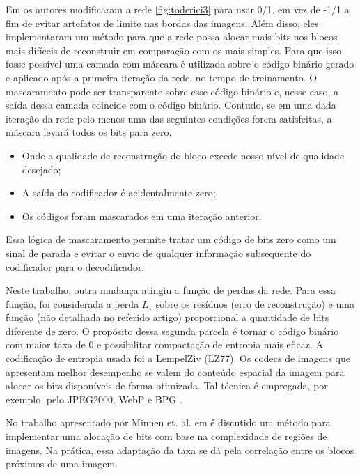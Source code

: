 Em \cite{target} os autores modificaram a rede \ref{fig:toderici3} 
para usar 0/1, em vez de -1/1 a fim de evitar artefatos de limite nas bordas das imagens. Além disso, eles implementaram um método para que a rede possa alocar mais bits nos blocos mais difíceis de reconstruir em comparação com os mais simples. 
Para que isso fosse possível uma camada com máscara é utilizada sobre o código binário gerado e aplicado após a primeira iteração da rede, no tempo de treinamento.
O mascaramento pode ser transparente sobre esse código binário e, nesse caso, a saída dessa camada coincide com o código binário. Contudo, se em uma dada iteração da rede pelo menos uma das seguintes condições forem satisfeitas, a máscara levará todos os bits para zero. 

\begin{itemize}
	\item  Onde a qualidade de reconstrução do bloco excede nosso nível de qualidade desejado;
	\item A saída do codificador é acidentalmente zero;
	\item Os códigos foram mascarados em uma iteração anterior.
\end{itemize}

Essa lógica de mascaramento permite tratar um código de bits zero como um sinal de parada e evitar o envio de qualquer informação subsequente do codificador para o decodificador.   

Neste trabalho, outra mudança atingiu a função de perdas da rede. Para essa função, foi considerada a perda $L_1$ sobre os resíduos (erro de reconstrução) e uma função (não detalhada no referido artigo) proporcional a quantidade de bits diferente de zero. O propósito dessa segunda parcela  é tornar o código binário com maior taxa de 0 e possibilitar compactação de entropia mais eficaz. A codificação de entropia usada foi a LempelZiv (LZ77). 
Os codecs de imagens que apresentam melhor desempenho se valem do conteúdo espacial da imagem para alocar os bits disponíveis de forma otimizada. Tal técnica é empregada, por exemplo, pelo JPEG2000, WebP e BPG \cite{boliek2000information}.

No trabalho apresentado por Minnen et. al. em \cite{SpatiallyAdaptive2018Minnen} é discutido um método para implementar uma alocação de bits com base na complexidade de regiões de imagens. Na prática, essa adaptação da taxa se dá pela correlação entre os blocos próximos de uma imagem. 


